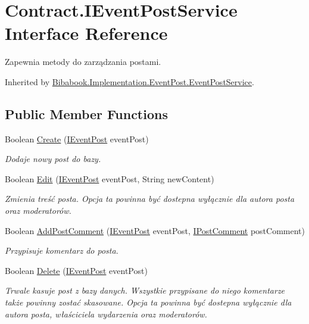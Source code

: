 \hypertarget{interface_contract_1_1_i_event_post_service}{}\section{Contract.\+I\+Event\+Post\+Service Interface Reference}
\label{interface_contract_1_1_i_event_post_service}


Zapewnia metody do zarządzania postami.  




Inherited by \hyperlink{class_bibabook_1_1_implementation_1_1_event_post_1_1_event_post_service}{Bibabook.\+Implementation.\+Event\+Post.\+Event\+Post\+Service}.

\subsection*{Public Member Functions}
\begin{DoxyCompactItemize}
\item 
Boolean \hyperlink{interface_contract_1_1_i_event_post_service_a11a32da680394e2cf58b30a792bc218b}{Create} (\hyperlink{interface_contract_1_1_i_event_post}{I\+Event\+Post} event\+Post)
\begin{DoxyCompactList}\small\item\em Dodaje nowy post do bazy. \end{DoxyCompactList}\item 
Boolean \hyperlink{interface_contract_1_1_i_event_post_service_a0a2f3bf67dcf7bc340e9371cffb8844d}{Edit} (\hyperlink{interface_contract_1_1_i_event_post}{I\+Event\+Post} event\+Post, String new\+Content)
\begin{DoxyCompactList}\small\item\em Zmienia treść posta. Opcja ta powinna być dostepna wyłącznie dla autora posta oraz moderatorów. \end{DoxyCompactList}\item 
Boolean \hyperlink{interface_contract_1_1_i_event_post_service_a24e60ba2af24abfe6d50df5f893500ea}{Add\+Post\+Comment} (\hyperlink{interface_contract_1_1_i_event_post}{I\+Event\+Post} event\+Post, \hyperlink{interface_contract_1_1_i_post_comment}{I\+Post\+Comment} post\+Comment)
\begin{DoxyCompactList}\small\item\em Przypisuje komentarz do posta. \end{DoxyCompactList}\item 
Boolean \hyperlink{interface_contract_1_1_i_event_post_service_a89a1e0b21e6123c0e927a92a48f33cc8}{Delete} (\hyperlink{interface_contract_1_1_i_event_post}{I\+Event\+Post} event\+Post)
\begin{DoxyCompactList}\small\item\em Trwale kasuje post z bazy danych. Wszystkie przypisane do niego komentarze także powinny zostać skasowane. Opcja ta powinna być dostepna wyłącznie dla autora posta, właściciela wydarzenia oraz moderatorów. \end{DoxyCompactList}\end{DoxyCompactItemize}


